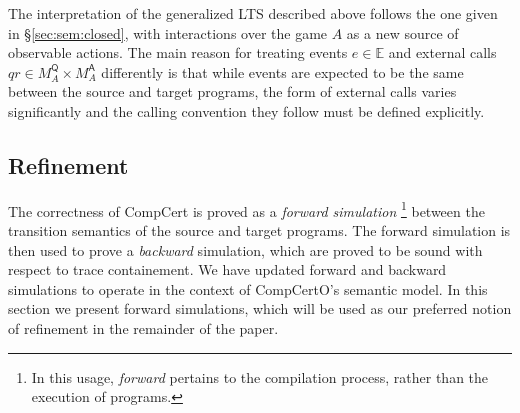 \documentclass[sigplan,10pt,review,anonymous]{acmart}
\newcommand{\kw}[1]{\ensuremath{ \mathsf{#1} }}
\newcommand{\bind}{\gg\!\!=}
\begin{document}
The interpretation of the generalized LTS described above
follows the one given in \S\ref{sec:sem:closed},
with interactions over the game $A$
as a new source of observable actions.
The main reason for treating
events $e \in \mathbb{E}$ and
external calls $qr \in M_A^\kw{Q} \times M_A^\kw{A}$
differently is that
while events are expected to be the same
between the source and target programs,
the form of external calls varies significantly
and the calling convention they follow
must be defined explicitly.




\subsection{Refinement} \label{sec:sem:ref} %

The correctness of CompCert is proved as a
\emph{forward simulation}%
\footnote{In this usage, \emph{forward} pertains to
  the compilation process,
  rather than the execution of programs.}
between the transition semantics of the source and target programs.
The forward simulation is then used to prove a \emph{backward} simulation,
which are proved to be sound with respect to trace containement.
We have updated forward and backward simulations to
operate in the context of CompCertO's semantic model.
In this section we present forward simulations,
which will be used as our preferred notion of refinement
in the remainder of the paper.
\end{document}
